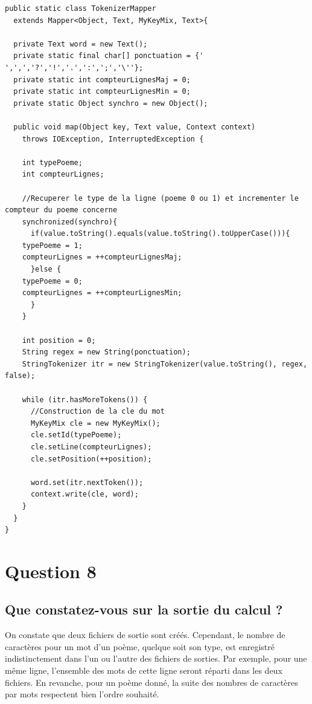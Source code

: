 \documentclass{article}
\begin{document}
\begin{lstlisting}
public static class TokenizerMapper 
  extends Mapper<Object, Text, MyKeyMix, Text>{
	  
  private Text word = new Text();
  private static final char[] ponctuation = {' ',',','?','!','.',':',';','\''};
  private static int compteurLignesMaj = 0;
  private static int compteurLignesMin = 0;
  private static Object synchro = new Object();
    
  public void map(Object key, Text value, Context context)
    throws IOException, InterruptedException {   	
        
    int typePoeme;
    int compteurLignes;
        
    //Recuperer le type de la ligne (poeme 0 ou 1) et incrementer le compteur du poeme concerne
    synchronized(synchro){
      if(value.toString().equals(value.toString().toUpperCase())){          
	typePoeme = 1;
	compteurLignes = ++compteurLignesMaj;
      }else {   
	typePoeme = 0;
	compteurLignes = ++compteurLignesMin;		
      }
    }
        
    int position = 0;    
    String regex = new String(ponctuation);
    StringTokenizer itr = new StringTokenizer(value.toString(), regex, false);
        
    while (itr.hasMoreTokens()) {
      //Construction de la cle du mot
      MyKeyMix cle = new MyKeyMix();
      cle.setId(typePoeme);
      cle.setLine(compteurLignes);
      cle.setPosition(++position);
      
      word.set(itr.nextToken());
      context.write(cle, word);
    }
  }
}  
\end{lstlisting}

  \section*{Question 8} 
    \subsection*{Que constatez-vous sur la sortie du calcul ?}

      On constate que deux fichiers de sortie sont créés. Cependant,
      le nombre de caractères pour un mot d'un poème, quelque soit son
      type, est enregistré indistinctement dans l'un ou l'autre des
      fichiers de sorties. Par exemple, pour une même ligne,
      l'ensemble des mots de cette ligne seront réparti dans les deux
      fichiers. En revanche, pour un poème donné, la suite des
      nombres de caractères par mots respectent bien l'ordre souhaité.
\end{document}
